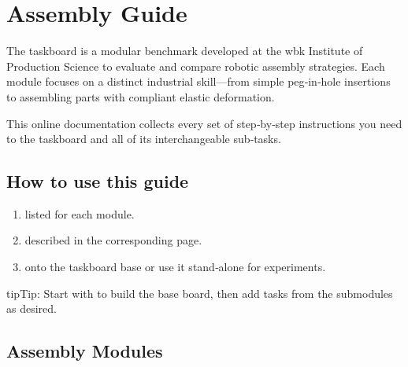 \documentclass[letterpaper,10pt,english]{sphinxmanual}
\begin{document}
\section{Assembly Guide}
\label{\detokenize{wbk_challenge_overview:assembly-guide}}\label{\detokenize{wbk_challenge_overview::doc}}
\sphinxAtStartPar
The  taskboard is a modular benchmark developed at the wbk Institute of Production Science to evaluate and compare robotic assembly strategies.
Each module focuses on a distinct industrial skill—from simple peg‑in‑hole insertions to assembling parts with compliant elastic deformation.

\sphinxAtStartPar
This online documentation collects every set of step‑by‑step instructions you need to  the taskboard and all of its interchangeable sub‑tasks.


\subsection{How to use this guide}
\label{\detokenize{wbk_challenge_overview:how-to-use-this-guide}}\begin{enumerate}
%
\item {} 
\sphinxAtStartPar
{} listed for each module.

\item {} 
\sphinxAtStartPar
{} described in the corresponding page.

\item {} 
\sphinxAtStartPar
{} onto the taskboard base or use it stand‑alone for experiments.

\end{enumerate}

\begin{sphinxadmonition}{tip}{Tip:}
\sphinxAtStartPar
Start with  to build the base board, then add tasks from the submodules as desired.
\end{sphinxadmonition}


\subsection{Assembly Modules}
\label{\detokenize{wbk_challenge_overview:assembly-modules}}
\sphinxstepscope
\end{document}
